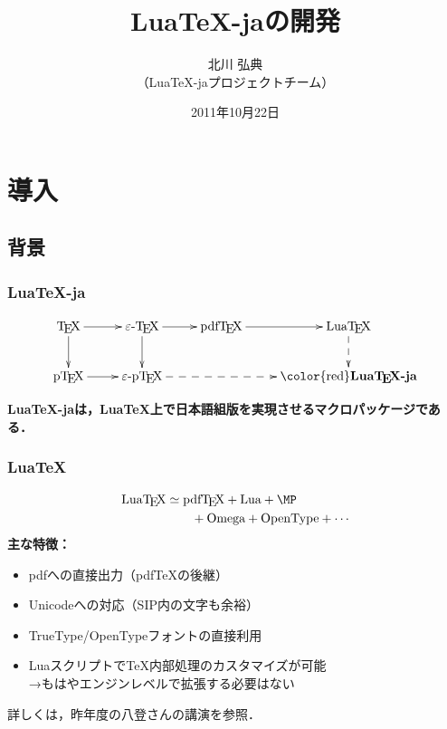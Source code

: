 \documentclass[notheorems,12pt,hyperref={unicode=true}]{beamer}
\title{Lua\TeX-jaの開発}
\author[北川 弘典]{北川 弘典\\\footnotesize（Lua\TeX-jaプロジェクトチーム）}
\date{2011年10月22日}
\def\alert#1{{\color{red}\bfseries#1}}
\begin{document}
\begin{frame}
  \titlepage
\end{frame}

\section{導入}


\subsection{背景}
\begin{frame}
  \frametitle{Lua\TeX-ja}
  {\large\[
    \xymatrix{
      \text{\TeX}\ar[r]\ar[d]&\text{$\varepsilon$-\TeX}\ar[d]\ar[r]
      &\text{pdf\TeX}\ar[r]&\text{Lua\TeX}\ar@{-->}[d]\\
      \text{p\TeX}\ar[r]&\text{$\varepsilon$-p\TeX}
      \ar@{-->}[rr]&&\text{\alert{Lua\TeX-ja}}
    }
  \]}%
  \begin{center}
    \bfseries\Large 
    Lua\TeX-jaは，Lua\TeX 上で日本語組版を実現させるマクロパッケージである．
  \end{center}
\end{frame}

\begin{frame}[fragile]
  \frametitle{Lua\TeX}
  {\large\begin{align*}
    \text{Lua\TeX}&\simeq \text{pdf\TeX}+ \text{Lua}+\text{\MP}\\
    &\qquad+\text{Omega}+\text{OpenType}+ \cdots
  \end{align*}}
  \textbf{主な特徴：}
  \begin{itemize}
    \item pdfへの直接出力（pdf\TeX の後継）
    \item Unicodeへの対応{\small （SIP内の文字も余裕）}
    \item TrueType/OpenTypeフォントの直接利用
    \item Luaスクリプトで\TeX 内部処理のカスタマイズが可能\\
      \quad →もはやエンジンレベルで拡張する必要はない
  \end{itemize}

  \footnotesize 詳しくは，昨年度の八登さんの講演を参照．
\end{frame}
\end{document}
